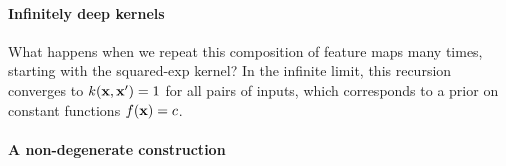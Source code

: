 \paragraph{Infinitely deep kernels}
What happens when we repeat this composition of feature maps many times, starting with the squared-exp kernel?  In the infinite limit, this recursion converges to $k({\bf{x}},{\bf{x}}') = 1$ for all pairs of inputs, which corresponds to a prior on constant functions $f({\bf{x}}) = c$.

%

\paragraph{A non-degenerate construction}

